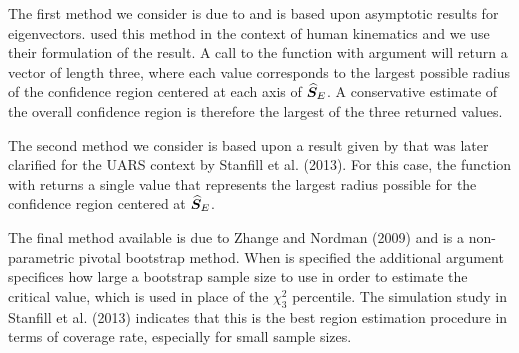 The first method we consider is due to \cite{prentice1986} and is based upon asymptotic results for eigenvectors.  \cite{rancourt2000} used this method in the context of human kinematics and we use their formulation of the result.  A call to the  function with argument  will return a vector of length three, where each value corresponds to the largest possible radius of the confidence region centered at each axis of $\widehat{\bm S}_E$.  A conservative estimate of the overall confidence region is therefore the largest of the three returned values.

The second method we consider is based upon a result given by \cite{chang2001} that was later clarified for the UARS context by Stanfill et al. (2013).  For this case, the  function with  returns a single value that represents the largest radius possible for the confidence region centered at $\widehat{\bm S}_E$.

The final method available is due to Zhange and Nordman (2009) and is a non-parametric pivotal bootstrap method.  When  is specified the additional  argument specifices how large a bootstrap sample size to use in order to estimate the critical value, which is used in place of the $\chi^2_3$ percentile.  The simulation study in Stanfill et al. (2013) indicates that this is the best region estimation procedure in terms of coverage rate, especially for small sample sizes.


% 

